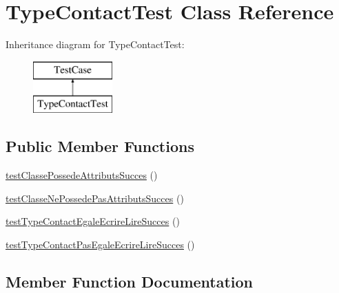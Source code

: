 \hypertarget{class_type_contact_test}{}\section{Type\+Contact\+Test Class Reference}
\label{class_type_contact_test}
Inheritance diagram for Type\+Contact\+Test\+:\begin{figure}[H]
\begin{center}
\leavevmode
\includegraphics[height=2.000000cm]{class_type_contact_test}
\end{center}
\end{figure}
\subsection*{Public Member Functions}
\begin{DoxyCompactItemize}
\item 
\hyperlink{class_type_contact_test_ab2190d4ce867be3e3d451344ae5c9277}{test\+Classe\+Possede\+Attributs\+Succes} ()
\item 
\hyperlink{class_type_contact_test_a007ff5c63dc82294888e56bee9e0028e}{test\+Classe\+Ne\+Possede\+Pas\+Attributs\+Succes} ()
\item 
\hyperlink{class_type_contact_test_aa29481a09b8e8a26251d40891116427c}{test\+Type\+Contact\+Egale\+Ecrire\+Lire\+Succes} ()
\item 
\hyperlink{class_type_contact_test_a8a96ad6c268f3f5193135a5dfe2c2780}{test\+Type\+Contact\+Pas\+Egale\+Ecrire\+Lire\+Succes} ()
\end{DoxyCompactItemize}


\subsection{Member Function Documentation}
\mbox{\label{class_type_contact_test_a007ff5c63dc82294888e56bee9e0028e}} 
